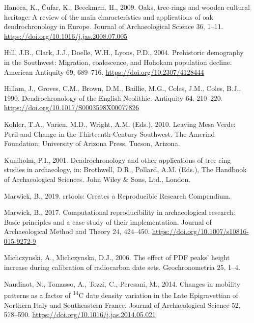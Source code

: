 \documentclass[
]{sa}
\newlength{\cslhangindent}
\newenvironment{cslreferences}%
  {\setlength{\parindent}{0pt}%
  \everypar{\setlength{\hangindent}{\cslhangindent}}\ignorespaces}%
  {\par}
\begin{document}
\begin{cslreferences}
\leavevmode\hypertarget{ref-Haneca2009}{}%
Haneca, K., Čufar, K., Beeckman, H., 2009. Oaks, tree-rings and wooden cultural heritage: A review of the main characteristics and applications of oak dendrochronology in Europe. Journal of Archaeological Science 36, 1--11. \url{https://doi.org/10.1016/j.jas.2008.07.005}

\leavevmode\hypertarget{ref-Hill2004}{}%
Hill, J.B., Clark, J.J., Doelle, W.H., Lyons, P.D., 2004. Prehistoric demography in the Southwest: Migration, coalescence, and Hohokam population decline. American Antiquity 69, 689--716. \url{https://doi.org/10.2307/4128444}

\leavevmode\hypertarget{ref-Hillam1990}{}%
Hillam, J., Groves, C.M., Brown, D.M., Baillie, M.G., Coles, J.M., Coles, B.J., 1990. Dendrochronology of the English Neolithic. Antiquity 64, 210--220. \url{https://doi.org/10.1017/S0003598X00077826}

\leavevmode\hypertarget{ref-Kohler2010b}{}%
Kohler, T.A., Varien, M.D., Wright, A.M. (Eds.), 2010. Leaving Mesa Verde: Peril and Change in the Thirteenth-Century Southwest. The Amerind Foundation; University of Arizona Press, Tucson, Arizona.

\leavevmode\hypertarget{ref-Kuniholm2001}{}%
Kuniholm, P.I., 2001. Dendrochronology and other applications of tree-ring studies in archaeology, in: Brothwell, D.R., Pollard, A.M. (Eds.), The Handbook of Archaeological Sciences. John Wiley \& Sons, Ltd., London.

\leavevmode\hypertarget{ref-rrtools}{}%
Marwick, B., 2019. rrtools: Creates a Reproducible Research Compendium.

\leavevmode\hypertarget{ref-Marwick2017}{}%
Marwick, B., 2017. Computational reproducibility in archaeological research: Basic principles and a case study of their implementation. Journal of Archaeological Method and Theory 24, 424--450. \url{https://doi.org/10.1007/s10816-015-9272-9}

\leavevmode\hypertarget{ref-Michczynski2006}{}%
Michczynski, A., Michczynska, D.J., 2006. The effect of PDF peaks' height increase during calibration of radiocarbon date sets. Geochronometria 25, 1--4.

\leavevmode\hypertarget{ref-Naudinot2014}{}%
Naudinot, N., Tomasso, A., Tozzi, C., Peresani, M., 2014. Changes in mobility patterns as a factor of \textsuperscript{14}C date density variation in the Late Epigravettian of Northern Italy and Southeastern France. Journal of Archaeological Science 52, 578--590. \url{https://doi.org/10.1016/j.jas.2014.05.021}


\end{cslreferences}
\end{document}
